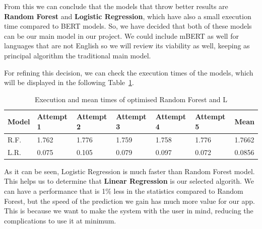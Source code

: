 From this we can conclude that the models that throw better results are \textbf{Random Forest} and \textbf{Logistic Regression}, which have also a small execution time compared to BERT models. So, we have decided that both of these models can be our main model in our project. We could include mBERT as well for languages that are not English so we will review its viability as well, keeping as principal algorithm the traditional main model.

For refining this decision, we can check the execution times of the models, which will be displayed in the following Table~\ref{tab:timestatistics}.

\begin{table}[h]
\begin{tabular}{|l|l|l|l|l|l|l|}
\hline
\textbf{Model}      & \textbf{Attempt 1} & \textbf{Attempt 2} & \textbf{Attempt 3} & \textbf{Attempt 4} & \textbf{Attempt 5} & \textbf{Mean} \\ \hline
R.F.       & 1.762              & 1.776              & 1.759              & 1.758              & 1.776              & 1.7662             \\ \hline
L.R. & 0.075              & 0.105              & 0.079              & 0.097              & 0.072              & 0.0856             \\ \hline
\end{tabular}
\caption{Execution and mean times of optimised Random Forest and L}
\label{tab:timestatistics}
\end{table}

As it can be seen, Logistic Regression is much faster than Random Forest model. This helps us to determine that \textbf{Linear Regression} is our selected algorith. We can have a performance that is 1\% less in the statistics compared to Random Forest, but the speed of the prediction we gain has much more value for our app. This is because we want to make the system with the user in mind, reducing the complications to use it at minimum.